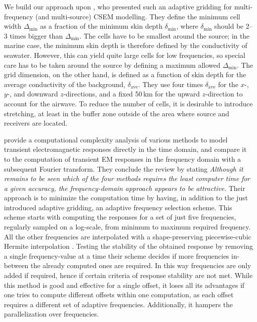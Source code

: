 \documentclass[extra, camera,%
]{gji}
\begin{document}
We build our approach upon \cite{GEO.07.Plessix}, who presented such an
adaptive gridding for multi-frequency (and multi-source) CSEM modelling. They
define the minimum cell width $\Delta_\mathrm{min}$ as a fraction of the
minimum skin depth $\delta_\mathrm{min}$, where $\delta_\mathrm{min}$ should be
2--3 times bigger than $\Delta_\mathrm{min}$. The cells have to be smallest
around the source; in the marine case, the minimum skin depth is therefore
defined by the conductivity of seawater. However, this can yield quite large
cells for low frequencies, so special care has to be taken around the source by
defining a maximum allowed $\Delta_\mathrm{min}$. The grid dimension, on the
other hand, is defined as a function of skin depth for the average conductivity
of the background, $\delta_\mathrm{ave}$. They use four times
$\delta_\mathrm{ave}$ for the $x$-, $y$-, and downward $z$-directions, and a
fixed 50\,km for the upward $z$-direction to account for the airwave. To reduce
the number of cells, it is desirable to introduce stretching, at least in the
buffer zone outside of the area where source and receivers are located.

\cite{GEO.08.Mulder} provide a computational complexity analysis of various
methods to model transient electromagnetic responses directly in the time
domain, and compare it to the computation of transient EM responses in the
frequency domain with a subsequent Fourier transform. They conclude the review
by stating \emph{\guillemotleft Although it remains to be seen which of the
four methods requires the least computer time for a given accuracy, the
frequency-domain approach appears to be attractive.\guillemotright} Their
approach is to minimize the computation time by having, in addition to the just
introduced adaptive gridding, an adaptive frequency selection scheme. This
scheme starts with computing the responses for a set of just five frequencies,
regularly sampled on a log-scale, from minimum to maximum required frequency.
All the other frequencies are interpolated with a shape-preserving
piecewise-cubic Hermite interpolation \citep[PCHIP, ][]{SIAM.80.Fritsch}.
Testing the stability of the obtained response by removing a single
frequency-value at a time their scheme decides if more frequencies in-between
the already computed ones are required. In this way frequencies are only added
if required, hence if certain criteria of response stability are not met. While
this method is good and effective for a single offset, it loses all its
advantages if one tries to compute different offsets within one computation, as
each offset requires a different set of adaptive frequencies. Additionally, it
hampers the parallelization over frequencies.
\end{document}

